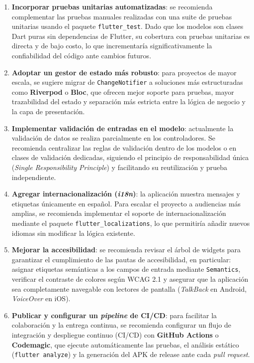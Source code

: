 \documentclass[12pt,a4paper]{article}
\begin{document}
\begin{enumerate}
  \item \textbf{Incorporar pruebas unitarias automatizadas}: se recomienda complementar las pruebas manuales realizadas con una suite de pruebas unitarias usando el paquete \texttt{flutter\_test}. Dado que los modelos son clases Dart puras sin dependencias de Flutter, su cobertura con pruebas unitarias es directa y de bajo costo, lo que incrementaría significativamente la confiabilidad del código ante cambios futuros.

  \item \textbf{Adoptar un gestor de estado más robusto}: para proyectos de mayor escala, se sugiere migrar de \texttt{ChangeNotifier} a soluciones más estructuradas como \textbf{Riverpod} o \textbf{Bloc}, que ofrecen mejor soporte para pruebas, mayor trazabilidad del estado y separación más estricta entre la lógica de negocio y la capa de presentación.

  \item \textbf{Implementar validación de entradas en el modelo}: actualmente la validación de datos se realiza parcialmente en los controladores. Se recomienda centralizar las reglas de validación dentro de los modelos o en clases de validación dedicadas, siguiendo el principio de responsabilidad única (\textit{Single Responsibility Principle}) y facilitando su reutilización y prueba independiente.

  \item \textbf{Agregar internacionalización (\textit{i18n})}: la aplicación muestra mensajes y etiquetas únicamente en español. Para escalar el proyecto a audiencias más amplias, se recomienda implementar el soporte de internacionalización mediante el paquete \texttt{flutter\_localizations}, lo que permitiría añadir nuevos idiomas sin modificar la lógica existente.

  \item \textbf{Mejorar la accesibilidad}: se recomienda revisar el árbol de widgets para garantizar el cumplimiento de las pautas de accesibilidad, en particular: asignar etiquetas semánticas a los campos de entrada mediante \texttt{Semantics}, verificar el contraste de colores según WCAG 2.1 y asegurar que la aplicación sea completamente navegable con lectores de pantalla (\textit{TalkBack} en Android, \textit{VoiceOver} en iOS).

  \item \textbf{Publicar y configurar un \textit{pipeline} de CI/CD}: para facilitar la colaboración y la entrega continua, se recomienda configurar un flujo de integración y despliegue continuo (CI/CD) con \textbf{GitHub Actions} o \textbf{Codemagic}, que ejecute automáticamente las pruebas, el análisis estático (\texttt{flutter analyze}) y la generación del APK de release ante cada \textit{pull request}.
\end{enumerate}
\end{document}
